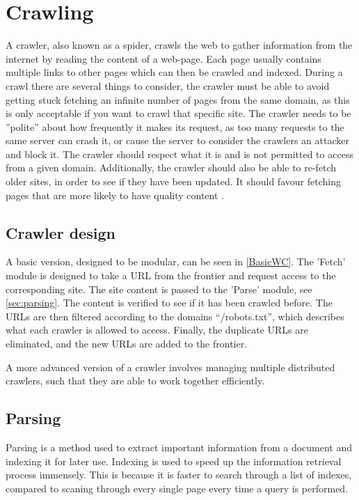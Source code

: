 \chapter{Crawling}

A crawler, also known as a spider, crawls the web to gather information from the
internet by reading the content of a web-page. Each page usually contains
multiple links to other pages which can then be crawled and indexed. During a
crawl there are several things to consider, the crawler must be able to avoid
getting stuck fetching an infinite number of pages from the same domain, as this
is only acceptable if you want to crawl that specific site. The crawler needs to
be ''polite'' about how frequently it makes its request, as too many requests to
the same server can crash it, or cause the server to consider the crawlers an
attacker and block it. The crawler should respect what it is and is not
permitted to access from a given domain. Additionally, the crawler should also
be able to re-fetch older sites, in order to see if they have been updated. It
should favour fetching pages that are more likely to have quality content
\citep[Ch. 20.1]{manning2008introduction}.\nl

\section{Crawler design}%
A basic version, designed to be modular, can be seen in \autoref{BasicWC}. The
'Fetch' module is designed to take a URL from the frontier and request access to
the corresponding site. The site content is passed to the 'Parse' module, see
\autoref{sec:parsing}.
The content is verified to see if it has been crawled before. The URLs are then
filtered according to the domains ``/robots.txt'', which describes what each
crawler is allowed to access. Finally, the duplicate URLs are eliminated, and
the new URLs are added to the frontier.


A more advanced version of a crawler involves managing multiple distributed
crawlers, such that they are able to work together efficiently.

\section{Parsing} \label{sec:parsing}
Parsing is a method used to extract important information from a document and
indexing it for later use. Indexing is used to speed up the information
retrieval process immensely. This is because it is faster to search through a
list of indexes, compared to scaning through every single page every time a
query is performed.

